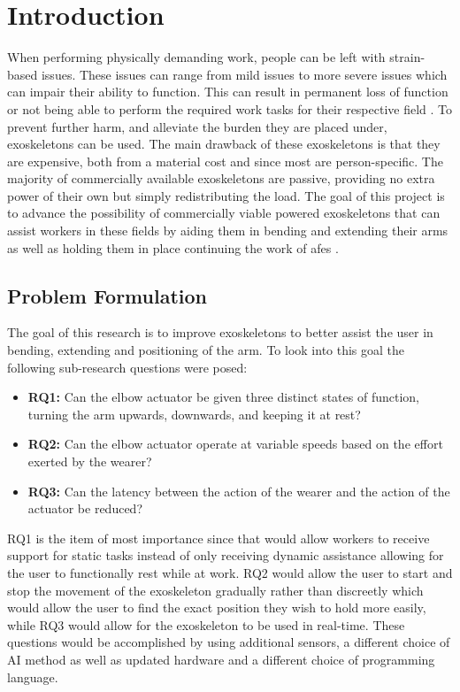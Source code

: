 \section{Introduction}
\label{section:intro}

When performing physically demanding work, people can be left with strain-based issues. These issues can range from mild issues to more severe issues which can impair their ability to function. 
This can result in permanent loss of function or not being able to perform the required work tasks for their respective field \cite{WorkDemands}. To prevent further harm, and alleviate the burden they are placed under, exoskeletons can be used.
The main drawback of these exoskeletons is that they are expensive, both from a material cost and since most are person-specific. The majority of commercially available 
exoskeletons are passive, providing no extra power of their own but simply redistributing the load. The goal of this 
project is to advance the possibility of commercially viable powered exoskeletons that can assist workers in these fields by aiding 
them in bending and extending their arms as well as holding them in place continuing the work of \acrfull{afes} \cite{AFES}.

\subsection{Problem Formulation}
The goal of this research is to improve exoskeletons to better assist the user in bending, extending and positioning of the arm.
To look into this goal the following sub-research questions were posed:
\begin{itemize}
        
    \item \textbf{RQ1:} Can the elbow actuator be given three distinct states of function, turning the arm upwards, downwards, and keeping it at rest?

    \item \textbf{RQ2:} Can the elbow actuator operate at variable speeds based on the effort exerted by the wearer?

    \item \textbf{RQ3:} Can the latency between the action of the wearer and the action of the actuator be reduced?

\end{itemize}
RQ1 is the item of most importance since that would allow workers to receive support for static tasks instead of only receiving dynamic
assistance allowing for the user to functionally rest while at work. RQ2 would allow the user to start and stop the
movement of the exoskeleton gradually rather than discreetly which would allow the user to find the exact position they
wish to hold more easily, while RQ3 would allow for the exoskeleton to be used in real-time. These questions would be
accomplished by using additional sensors, a different choice of AI method as well as updated hardware and a different
choice of programming language.\newline


